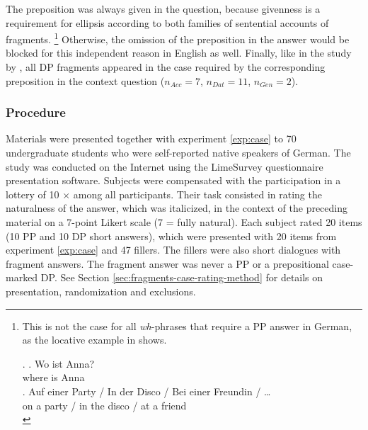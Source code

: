 The preposition was always given in the question, because givenness is a requirement for ellipsis according to both families of sentential accounts of fragments.%
%
\footnote{This is not the case for all \textit{wh}-phrases that require a PP answer in German, as the locative example in \Next shows.

\ex. \ag. Wo ist Anna?\\
      where is Anna\\
      \bg. Auf einer Party / In der Disco / Bei einer Freundin / \dots\\
	on a party / in the disco / at a friend \mbox{} \mbox{}\\

 }\afterfn%
%
Otherwise, the omission of the preposition in the answer would be blocked for this independent reason in English as well. Finally, like in the study by \citet{merchant.etal2013}, all DP fragments appeared in the case required by the corresponding preposition in the context question ($n_{Acc} = 7$, $n_{Dat} = 11$, $n_{Gen} = 2$).

\subsubsection{Procedure}
\label{sec:pstranding-german-method}
\begin{sloppypar}
Materials were presented together with experiment \ref{exp:case} to 70 undergraduate students who were self-reported native speakers of German. The study was conducted on the Internet using the LimeSurvey questionnaire presentation software. Subjects were compensated with the participation in a lottery of 10 $\times$  among all participants. Their task consisted in rating the naturalness of the answer, which was italicized, in the context of the preceding material on a 7-point Likert scale (7 = fully natural). Each subject rated 20 items (10 PP and 10 DP short answers), which were presented with 20 items from experiment \ref{exp:case} and 47 fillers. The fillers were also short dialogues with fragment answers. The fragment answer was never a PP or a prepositional case-marked DP. See Section \ref{sec:fragments-case-rating-method} for details on presentation, randomization and exclusions.\end{sloppypar}
     

